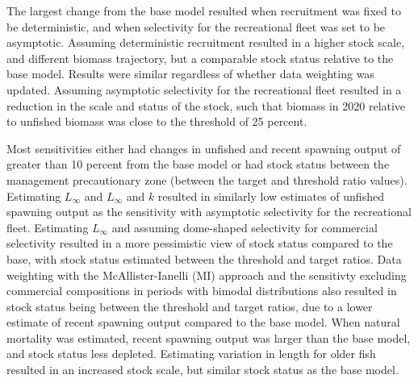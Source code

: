 \documentclass[11pt,
  english,
  a4paper,
]{article}
\begin{document}

The largest change from the base model resulted when recruitment was fixed to be deterministic, and when selectivity for the recreational fleet was set to be asymptotic. Assuming deterministic recruitment resulted in a higher stock scale, and different biomass trajectory, but a comparable stock status relative to the base model. Results were similar regardless of whether data weighting was updated. Assuming asymptotic selectivity for the recreational fleet resulted in a reduction in the scale and status of the stock, such that biomass in 2020 relative to unfished biomass was close to the threshold of 25 percent.

\leavevmode\tagmcend\tagstructend\par


Most sensitivities either had changes in unfished and recent spawning output of greater than 10 percent from the base model or had stock status between the management precautionary zone (between the target and threshold ratio values). Estimating {\(L_{\infty}\)\leavevmode\tagmcend\tagstructend} and {\(L_{\infty}\)\leavevmode\tagmcend\tagstructend} and {\(k\)\leavevmode\tagmcend\tagstructend} resulted in similarly low estimates of unfished spawning output as the sensitivity with asymptotic selectivity for the recreational fleet. Estimating {\(L_{\infty}\)\leavevmode\tagmcend\tagstructend} and assuming dome-shaped selectivity for commercial selectivity resulted in a more pessimistic view of stock status compared to the base, with stock status estimated between the threshold and target ratios. Data weighting with the McAllister-Ianelli (MI) approach and the sensitivty excluding commercial compositions in periods with bimodal distributions also resulted in stock status being between the threshold and target ratios, due to a lower estimate of recent spawning output compared to the base model. When natural mortality was estimated, recent spawning output was larger than the base model, and stock status less depleted. Estimating variation in length for older fish resulted in an increased stock scale, but similar stock status as the base model.

\leavevmode\tagmcend\tagstructend\par
\end{document}
